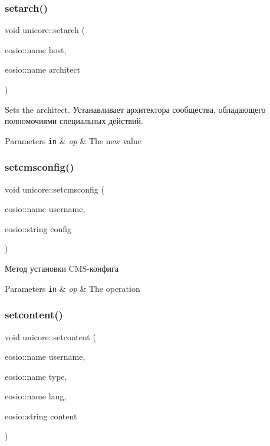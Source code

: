 \subsubsection{\texorpdfstring{setarch()}{setarch()}}
{\footnotesize\ttfamily void unicore\+::setarch (\begin{DoxyParamCaption}\item[{eosio\+::name}]{host,  }\item[{eosio\+::name}]{architect }\end{DoxyParamCaption})}



Sets the architect. Устанавливает архитектора сообщества, обладающего полномочиями специальных действий. 


\begin{DoxyParams}[1]{Parameters}
\mbox{\tt in}  & {\em op} & The new value \\
\hline
\end{DoxyParams}
\mbox{\label{classunicore_ad0188feae42e22b52afbb6e3c3f70c86}} 
\subsubsection{\texorpdfstring{setcmsconfig()}{setcmsconfig()}}
{\footnotesize\ttfamily void unicore\+::setcmsconfig (\begin{DoxyParamCaption}\item[{eosio\+::name}]{username,  }\item[{eosio\+::string}]{config }\end{DoxyParamCaption})}



Метод установки C\+M\+S-\/конфига 


\begin{DoxyParams}[1]{Parameters}
\mbox{\tt in}  & {\em op} & The operation \\
\hline
\end{DoxyParams}
\mbox{\label{classunicore_abab6ddd4a167efde5f0e45a1ffd9dfba}} 
\subsubsection{\texorpdfstring{setcontent()}{setcontent()}}
{\footnotesize\ttfamily void unicore\+::setcontent (\begin{DoxyParamCaption}\item[{eosio\+::name}]{username,  }\item[{eosio\+::name}]{type,  }\item[{eosio\+::name}]{lang,  }\item[{eosio\+::string}]{content }\end{DoxyParamCaption})}



